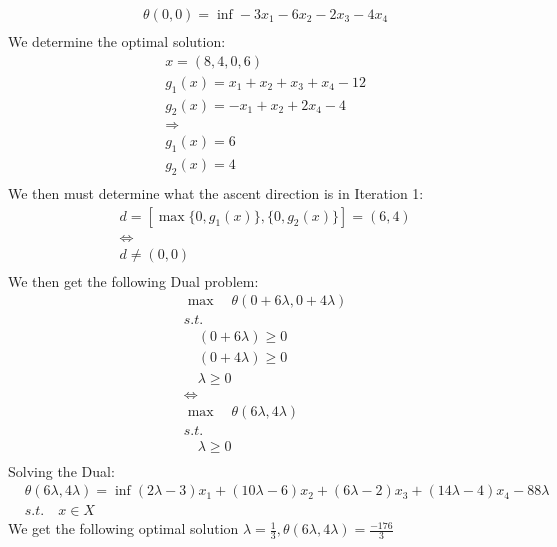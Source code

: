 \documentclass[12pt]{article}
\begin{document}
    \begin{align*}
        &\theta(0,0) = \inf -3x_1 - 6x_2 - 2x_3 - 4x_4\\
    \end{align*}
    We determine the optimal solution:\\
    \begin{align*}
        &x=(8,4,0,6)\\
        &g_1(x) = x_1 + x_2 + x_3 + x_4 -12\\
        &g_2(x) = -x_1 + x_2 + 2x_4 - 4 \\
        &\Longrightarrow\\
        &g_1(x) = 6\\
        &g_2(x) = 4\\
    \end{align*}
    We then must determine what the ascent direction is in Iteration 1: \\ 
    \begin{align*}
        &d = [\max \{0, g_1(x)\} , \{0,g_2(x)\}] = (6,4)\\
        &\Longleftrightarrow \\
        &d \neq (0,0)\\
    \end{align*}
    We then get the following Dual problem: 
    \begin{align*}
        &\max \quad \theta(0 + 6\lambda , 0 + 4\lambda) \\ 
        &s.t.\\
        &\quad (0 + 6\lambda) \geq 0\\
        &\quad (0 + 4 \lambda) \geq 0 \\ 
        &\quad \lambda \geq 0\\
        &\Longleftrightarrow\\
        &\max \quad \theta (6\lambda, 4\lambda)\\
        &s.t.\\
        &\quad \lambda \geq 0 \\ 
    \end{align*}
    Solving the Dual: \\
    \begin{align*}
        &\theta(6\lambda,4\lambda) = \inf  (2\lambda -3) x_1 + (10\lambda - 6) x_2 + (6\lambda -2) x_3 + (14\lambda -4) x_4 - 88\lambda\\
        &s.t. \quad  x \in X
    \end{align*}
    We get the following optimal solution $\lambda = \frac{1}{3}, \theta(6\lambda, 4\lambda) = \frac{-176}{3}$\\ \\
\end{document}
